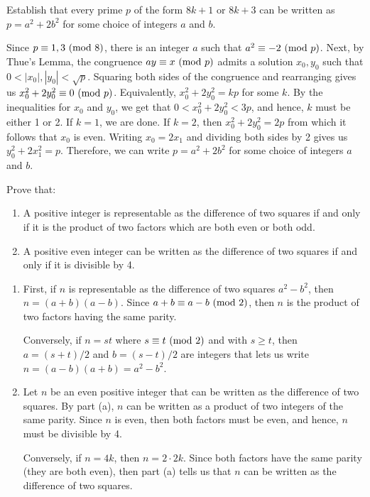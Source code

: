 \begin{exercise}
    Establish that every prime $p$ of the form $8k+1$ or $8k+3$ can be written as $p = a^2 + 2b^2$ for some choice of integers $a$ and $b$.  \\
\end{exercise}

\begin{solution}
    Since $p \equiv 1, 3 \ (\mathrm{mod}\ 8)$, there is an integer $a$ such that $a^2 \equiv -2 \ (\mathrm{mod}\ p)$. Next, by Thue's Lemma, the congruence $ay \equiv x \ (\mathrm{mod}\ p)$ admits a solution $x_0, y_0$ such that $0 < |x_0|, |y_0| < \sqrt{p}$. Squaring both sides of the congruence and rearranging gives us $x_0^2 + 2y_0^2 \equiv 0 \ (\mathrm{mod}\ p)$. Equivalently, $x_0^2 + 2y_0^2 = kp$ for some $k$. By the inequalities for $x_0$ and $y_0$, we get that $0 < x_0^2 + 2y_0^2 < 3p$, and hence, $k$ must be either 1 or 2. If $k = 1$, we are done. If $k = 2$, then $x_0^2 + 2y_0^2 = 2p$ from which it follows that $x_0$ is even. Writing $x_0 = 2x_1$ and dividing both sides by 2 gives us $y_0^2 + 2x_1^2 = p$. Therefore, we can write $p = a^2 + 2b^2$ for some choice of integers $a$ and $b$. \\
\end{solution}

\begin{exercise}
    Prove that:
    \begin{enumerate}
        \item A positive integer is representable as the difference of two squares if and only if it is the product of two factors which are both even or both odd.
        \item A positive even integer can be written as the difference of two squares if and only if it is divisible by 4. \\
    \end{enumerate}
\end{exercise}

\begin{solution}
    \begin{enumerate}
        \item First, if $n$ is representable as the difference of two squares $a^2 - b^2$, then $n = (a+b)(a-b)$. Since $a+ b \equiv a - b \ (\mathrm{mod}\ 2)$, then $n$ is the product of two factors having the same parity. 
        
        Conversely, if $n = st$ where $s \equiv t \ (\mathrm{mod}\ 2)$ and with $s \geq t$, then $a = (s + t)/2$ and $b = (s-t)/2$ are integers that lets us write $n = (a-b)(a+b) = a^2 - b^2$.
        \item Let $n$ be an even positive integer that can be written as the difference of two squares. By part (a), $n$ can be written as a product of two integers of the same parity. Since $n$ is even, then both factors must be even, and hence, $n$ must be divisible by 4. 
        
        Conversely, if $n = 4k$, then $n = 2\cdot 2k$. Since both factors have the same parity (they are both even), then part (a) tells us that $n$ can be written as the difference of two squares. \\
    \end{enumerate}
\end{solution}

